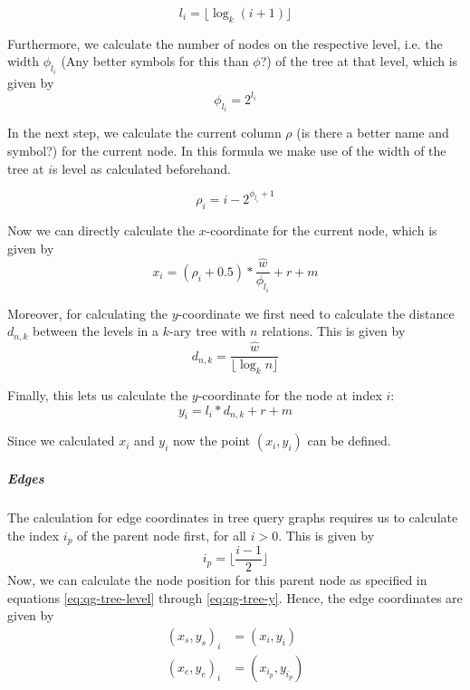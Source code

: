 \begin{equation}
    \label{eq:qg-tree-level}
    l_i = \lfloor \log_{k}(i+1)\rfloor
\end{equation}

Furthermore, we calculate the number of nodes on the respective level, i.e. the width $\phi_{l_i}$ (Any better symbols for this than $\phi$?) of the tree at that level, which is given by
\begin{equation}
    \phi_{l_i} = 2^{l_i}
\end{equation}

In the next step, we calculate the current column $\rho$ (is there a better name and symbol?) for the current node. In this formula we make use of the width of the tree at $i$s level as calculated beforehand.

\begin{equation}
    \rho_{i} = i - 2^{\phi_{l_i} + 1}
\end{equation}

Now we can directly calculate the $x$-coordinate for the current node, which is given by
\begin{equation}
    x_i = (\rho_{i} + 0.5) * \frac{\hat{w}}{\phi_{l_i}} + r + m
\end{equation}

Moreover, for calculating the $y$-coordinate we first need to calculate the distance $d_{n,k}$ between the levels in a $k$-ary tree with $n$ relations. This is given by
\begin{equation}
    d_{n,k} = \frac{\hat{w}}{\lfloor \log_k{n} \rfloor}
\end{equation}

Finally, this lets us calculate the $y$-coordinate for the node at index $i$:
\begin{equation}
    \label{eq:qg-tree-y}
    y_i = l_i * d_{n,k} + r + m
\end{equation}

Since we calculated $x_i$ and $y_i$ now the point $(x_i, y_i)$ can be defined.

\subparagraph{Edges}
The calculation for edge coordinates in tree query graphs requires us to calculate the index $i_p$ of the parent node first, for all $i > 0$. This is given by 
\begin{equation}
    i_p = \lfloor \frac{i-1}{2} \rfloor
\end{equation}
Now, we can calculate the node position for this parent node as specified in equations \ref{eq:qg-tree-level} through \ref{eq:qg-tree-y}. Hence, the edge coordinates are given by 
\begin{equation}
    \begin{aligned}
        (x_s, y_s)_i &= (x_i, y_i)\\   
        (x_e, y_e)_i &= (x_{i_p}, y_{i_p})
    \end{aligned}
\end{equation}

